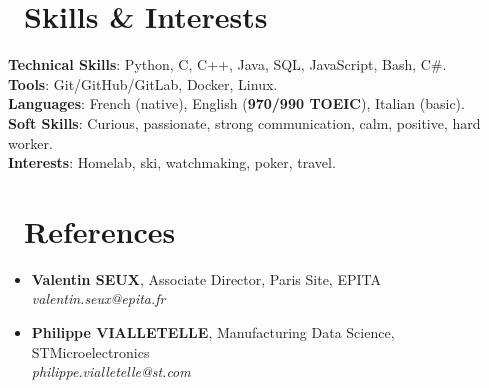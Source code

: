 \documentclass[letterpaper,11pt]{article}
\begin{document}
\section*{\small \faTools\ \large Skills \& Interests}
\begin{itemize}[leftmargin=0.15in, label={}]
  \small{\item{
    \textbf{Technical Skills}{: Python, C, C++, Java, SQL, JavaScript, Bash, C\#.} \\
    \textbf{Tools}{: Git/GitHub/GitLab, Docker, Linux.} \\
    \textbf{Languages}{: French (native), English (\textbf{970/990 TOEIC}), Italian (basic).} \\
    \textbf{Soft Skills}{: Curious, passionate, strong  communication, calm, positive, hard worker.} \\
    \textbf{Interests}{: Homelab, ski, watchmaking, poker, travel.}
  }}
\end{itemize}

\section*{\small \faUserTie\ \tiny References}
\begin{itemize}[leftmargin=0.15in, label={}]
  \item \textbf{Valentin SEUX}, Associate Director, Paris Site, EPITA \\
  \textit{valentin.seux@epita.fr} \\

  \item \textbf{Philippe VIALLETELLE}, Manufacturing Data Science, STMicroelectronics \\
  \textit{philippe.vialletelle@st.com} \\
\end{itemize}
\end{document}
